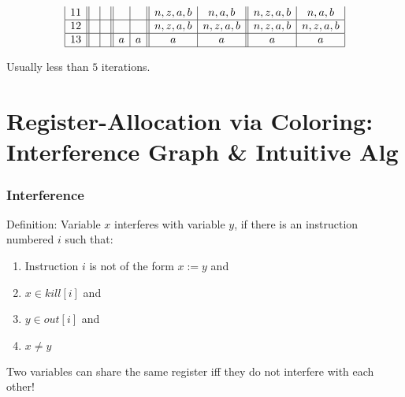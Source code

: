 \documentclass{beamer}
\renewcommand{\emph}[1]{\textcolor{structure}{#1}}
\newcommand{\emp}[1]{\textcolor{DikuRed}{ #1}}
\begin{document}
\begin{frame}
\[\begin{array}{|r||c|c||c|c||c|c||c|c|}
11   &        &       &
              &       &
     n,z,a,b  & n,a,b &
     n,z,a,b  & n,a,b \\\hline

12   &        &       &
              &       &
     n,z,a,b  & n,z,a,b &
     n,z,a,b  & n,z,a,b \\\hline

13   &        &       &
       a      & a     &
       a      & a     &
       a      & a     \\\hline
\end{array}\]

\setlength{\arraycolsep}{\savesep}

Usually less than $5$ iterations.

\end{frame}



\section{Register-Allocation via Coloring: Interference Graph \& Intuitive Alg}

\begin{frame}[fragile]
	\tableofcontents[currentsection]
\end{frame}

\begin{frame}
\frametitle{Interference}

\emph{Definition:} Variable $x$ \emp{interferes} with variable $y$, 
if there is an instruction numbered $i$ such that:

\smallskip

\begin{enumerate}
\item Instruction $i$ is not of the form $x := y$ \emp{and}
\item $x \in kill[i]$ \emp{and}
\item $y \in out[i]$  \emp{and}
\item $x \neq y$
\end{enumerate}

\bigskip

\emph{Two variables can share the same register iff they do not interfere
with each other!}

\end{frame}
\end{document}
